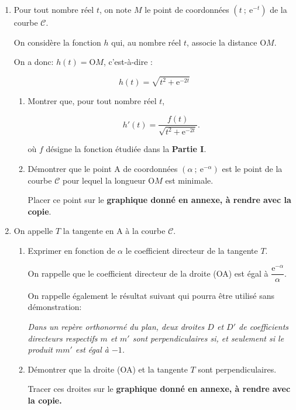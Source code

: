 \documentclass[10pt]{article}
\begin{document}
\begin{enumerate}
\item Pour tout nombre réel $t$, on note $M$ le point de coordonnées $\left(t~;~\text{e}^{-t}\right)$ de la courbe $\mathcal{C}$.

On considère la fonction $h$ qui, au nombre réel $t$, associe la distance O$M$.

On a donc: $h(t) = \text{O}M$, c'est-à-dire :

\[h(t) = \sqrt{t^2 + \text{e}^{-2t}}\]

	\begin{enumerate}
		\item Montrer que, pour tout nombre réel $t$,

\[h'(t) = \dfrac{f(t)}{\sqrt{t^2 + \text{e}^{-2t}}}.\]

où $f$ désigne la fonction étudiée dans la \textbf{Partie I}.
		\item Démontrer que le point A de coordonnées $\left(\alpha~;~\text{e}^{-\alpha}\right)$ est le point de la courbe $\mathcal{C}$ pour lequel la longueur O$M$ est minimale.
		

Placer ce point sur le \textbf{graphique donné en annexe, à rendre avec la copie}.
	\end{enumerate}
\item On appelle $T$ la tangente en A à la courbe $\mathcal{C}$.
	\begin{enumerate}
		\item Exprimer en fonction de $\alpha$ le coefficient directeur de la tangente $T$.
		
On rappelle que le coefficient directeur de la droite (OA) est égal à $\dfrac{\text{e}^{-\alpha}}{\alpha}$.

On rappelle également le résultat suivant qui pourra être utilisé sans démonstration:

\emph{Dans un repère orthonormé du plan, deux droites $D$ et $D'$ de coefficients directeurs respectifs $m$ et $m'$ sont perpendiculaires si, et seulement si le produit $mm'$ est égal à $-1$.}

		\item Démontrer que la droite (OA) et la tangente $T$ sont perpendiculaires. 
		
Tracer ces droites sur le \textbf{graphique donné en annexe, à rendre avec la copie.}
	\end{enumerate}
\end{enumerate}
\end{document}
